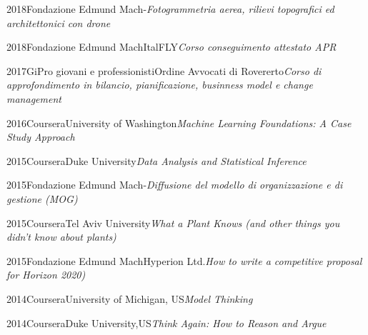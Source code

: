 \documentclass{curriculum}
\begin{document}
    \begin{entrylist}
    \entry
        {2018}{Fondazione Edmund Mach}{-}{\emph{Fotogrammetria aerea, rilievi topografici ed architettonici con drone}}
    \end{entrylist}
   
    \begin{entrylist}
    \entry
        {2018}{Fondazione Edmund Mach}{ItalFLY}{\emph{Corso conseguimento attestato APR}}
    \end{entrylist}
    
    \begin{entrylist}
    \entry
        {2017}{GiPro giovani e professionisti}{Ordine Avvocati di Rovererto}{\emph{Corso di approfondimento in bilancio, pianificazione, businness model e change management}}
    \end{entrylist} 
    
    \begin{entrylist}
    \entry
        {2016}{Coursera}{University of Washington}{\emph{Machine Learning Foundations: A Case Study Approach}}
    \end{entrylist}
    
    \begin{entrylist}
    \entry
        {2015}{Coursera}{Duke University}{\emph{Data Analysis and Statistical Inference}}
    \end{entrylist}
    
    \begin{entrylist}
    \entry
        {2015}{Fondazione Edmund Mach}{-}{\emph{Diffusione del modello di organizzazione e di gestione (MOG)}}
    \end{entrylist}
    
    \begin{entrylist}
    \entry
        {2015}{Coursera}{Tel Aviv University}{\emph{What a Plant Knows (and other things you didn’t know about plants)}}
    \end{entrylist}

    \begin{entrylist}
    \entry
        {2015}{Fondazione Edmund Mach}{Hyperion Ltd.}{\emph{How to write a competitive proposal for Horizon 2020)}}
    \end{entrylist}
    
    \begin{entrylist}
    \entry
        {2014}{Coursera}{University of Michigan, US}{\emph{Model Thinking}}
    \end{entrylist}
    \begin{entrylist}
    \entry
        {2014}{Coursera}{Duke University,US}{\emph{Think Again: How to Reason and Argue}}
    \end{entrylist}
    
\end{document}
